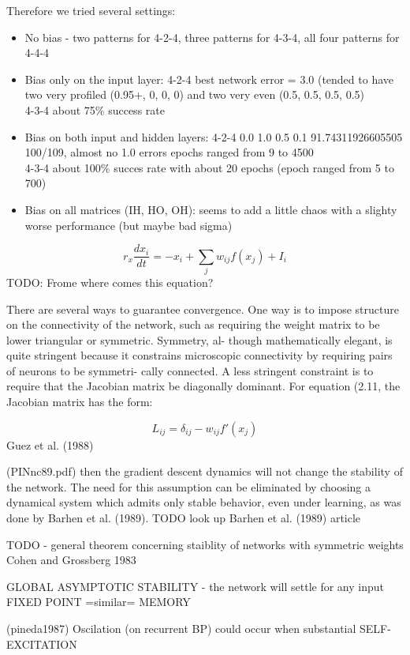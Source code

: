 Therefore we tried several settings: 
\begin{itemize} 
\item No bias - two patterns for 4-2-4, three patterns for 4-3-4, all four patterns for 4-4-4
\item Bias only on the input layer:  
4-2-4 best network error = 3.0 (tended to have two very profiled (0.95+, 0, 0, 0) and two very even (0.5, 0.5, 0.5, 0.5)  \\
4-3-4 about 75\% success rate 
\item Bias on both input and hidden layers: 
    4-2-4 0.0 1.0 0.5 0.1 91.74311926605505 100/109, almost no 1.0 errors 
          epochs ranged from 9 to 4500 \\ 
    4-3-4 about 100\% succes rate with about 20 epochs (epoch ranged from 5 to 700) 
\item Bias on all matrices (IH, HO, OH): 
    seems to add a little chaos with a slighty worse performance (but maybe bad sigma)

\end{itemize} 

$$r_x\frac{dx_i}{dt} = -x_i + \sum_j w_{ij} f(x_j) + I_i$$
TODO: Frome where comes this equation? 

There are several ways to guarantee convergence. One way is to
impose structure on the connectivity of the network, such as requiring
the weight matrix to be lower triangular or symmetric. Symmetry, al-
though mathematically elegant, is quite stringent because it constrains
microscopic connectivity by requiring pairs of neurons to be symmetri-
cally connected. A less stringent constraint is to require that the Jacobian
matrix be diagonally dominant. For equation (2.11, the Jacobian matrix
has the form: 

$$L_{ij} = \delta_{ij} - w_{ij}f'(x_j)$$
Guez et al. (1988) 

(PINnc89.pdf) then the gradient descent dynamics will not change the stability of the network. The need
for this assumption can be eliminated by choosing a dynamical system
which admits only stable behavior, even under learning, as was done by
Barhen et al. (1989). TODO look up Barhen et al. (1989) article 

TODO - general theorem concerning staiblity of networks with symmetric weights Cohen and Grossberg 1983 

GLOBAL ASYMPTOTIC STABILITY - the network will settle for any input 
FIXED POINT =similar= MEMORY

(pineda1987) Oscilation (on recurrent BP) could occur when substantial SELF-EXCITATION 

